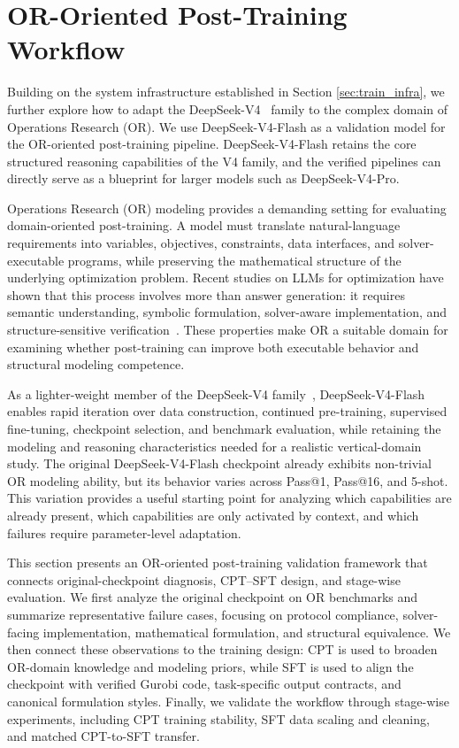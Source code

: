 \section{OR-Oriented Post-Training Workflow}
\label{sec:or_post_training_workflow}

Building on the system infrastructure established in Section \ref{sec:train_infra}, we further
explore how to adapt the DeepSeek-V4~\citep{deepseekai2026deepseekv4highlyefficientmilliontoken} family to the complex domain of
Operations Research (OR). We use DeepSeek-V4-Flash as a
validation model for the OR-oriented post-training pipeline. DeepSeek-V4-Flash retains the core structured reasoning
capabilities of the V4 family, and the verified pipelines can
directly serve as a blueprint for larger models such as DeepSeek-V4-Pro.

Operations Research (OR) modeling provides a demanding setting for evaluating
domain-oriented post-training. A model must translate natural-language
requirements into variables, objectives, constraints, data interfaces, and
solver-executable programs, while preserving the mathematical structure of the
underlying optimization problem. Recent studies on LLMs for optimization have
shown that this process involves more than answer generation: it requires
semantic understanding, symbolic formulation, solver-aware implementation, and
structure-sensitive verification~\citep{xiao2025optimization_llm_survey,
wang2025llm_or_survey,orqa,orgeval}. These properties make OR a suitable
domain for examining whether post-training can improve both executable behavior
and structural modeling competence.

As a lighter-weight member of the DeepSeek-V4 family~\citep{deepseekai2026deepseekv4highlyefficientmilliontoken}, DeepSeek-V4-Flash 
enables rapid iteration over data construction, continued pre-training,
supervised fine-tuning, checkpoint selection, and benchmark evaluation,
while retaining the modeling and reasoning characteristics needed for a
realistic vertical-domain study.
The original DeepSeek-V4-Flash checkpoint already exhibits non-trivial OR
modeling ability, but its behavior varies across Pass@1, Pass@16, and 5-shot.
This variation provides a
useful starting point for analyzing which capabilities are already present,
which capabilities are only activated by context, and which failures require
parameter-level adaptation.

This section presents an OR-oriented post-training validation framework that
connects original-checkpoint diagnosis, CPT--SFT design, and stage-wise
evaluation. We first analyze the original checkpoint on OR benchmarks and
summarize representative failure cases, focusing on protocol compliance,
solver-facing implementation, mathematical formulation, and structural
equivalence. We then connect these observations to the training design: CPT is
used to broaden OR-domain knowledge and modeling priors, while SFT is used to
align the checkpoint with verified Gurobi code, task-specific output contracts,
and canonical formulation styles. Finally, we validate the workflow through
stage-wise experiments, including CPT training stability, SFT data scaling and
cleaning, and matched CPT-to-SFT transfer.

